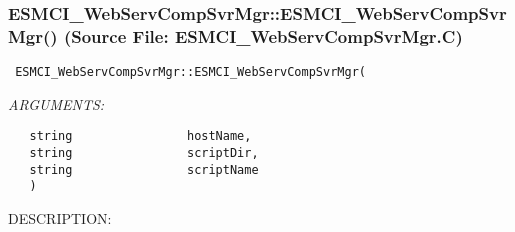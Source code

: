  
\setlength{\oldparskip}{\parskip}
\setlength{\parskip}{1.5ex}
\setlength{\oldparindent}{\parindent}
\setlength{\parindent}{0pt}
\setlength{\oldbaselineskip}{\baselineskip}
\setlength{\baselineskip}{11pt}
 
\def\bv{\begin{verbatim}}
\def\ev{\end{verbatim}}
\def\be{\begin{equation}}
\def\ee{\end{equation}}
\def\bea{\begin{eqnarray}}
\def\eea{\end{eqnarray}}
\def\bi{\begin{itemize}}
\def\ei{\end{itemize}}
\def\bn{\begin{enumerate}}
\def\en{\end{enumerate}}
\def\bd{\begin{description}}
\def\ed{\end{description}}
\def\({\left (}
\def\){\right )}
\def\[{\left [}
\def\]{\right ]}
\def\<{\left  \langle}
\def\>{\right \rangle}
\def\cI{{\cal I}}
\def\diag{\mathop{\rm diag}}
\def\tr{\mathop{\rm tr}}


 
\subsubsection{ESMCI\_WebServCompSvrMgr::ESMCI\_WebServCompSvrMgr() (Source File: ESMCI\_WebServCompSvrMgr.C)}


  
\begin{verbatim} ESMCI_WebServCompSvrMgr::ESMCI_WebServCompSvrMgr(\end{verbatim}{\em ARGUMENTS:}
\begin{verbatim}   string                hostName,
   string                scriptDir,
   string                scriptName
   )\end{verbatim}
{\sf DESCRIPTION:\\ }


